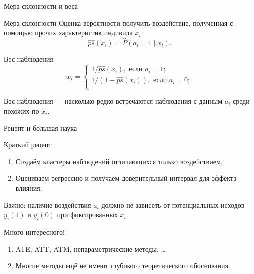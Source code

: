 \begin{frame}{Мера склонности и веса}
  \begin{block}{Мера склонности}
    Оценка вероятности получить воздействие, полученная с помощью прочих характеристик индивида $x_i$.
    \[
    \widehat{ps}(x_i) = \hat P(a_i = 1 \mid x_i).
    \]
  \end{block}
  \pause
  \begin{block}{Вес наблюдения}
    \[
      w_i = \begin{cases}
          1 / \widehat{ps}(x_i), \text{ если } a_i = 1; \\
          1 / (1 - \widehat{ps}(x_i)), \text{ если } a_i = 0; \\
      \end{cases}
    \]
  \end{block}
  \pause
  Вес наблюдения — насколько редко встречаются наблюдения с данным $a_i$ среди похожих по $x_i$. 
\end{frame}

\begin{frame}{Рецепт и большая наука}

\begin{block}{Краткий рецепт}
\begin{enumerate}
  \item Создаём кластеры наблюдений отличающихся только воздействием. 
  \item Оцениваем регрессию и получаем доверительный интервал для эффекта влияния.
\end{enumerate}
\end{block}

\alert{Важно:} наличие воздействия $a_i$ должно не зависеть 
от потенциальных исходов $y_i(1)$ и $y_i(0)$ при фиксированных $x_i$.

\pause

\begin{block}{Много интересного!}
  \begin{enumerate}
    \item ATE, ATT, ATM, непараметрические методы, \ldots
    \item Многие методы ещё не имеют глубокого теоретического обоснования. 
  \end{enumerate}
\end{block}
  
\end{frame}

